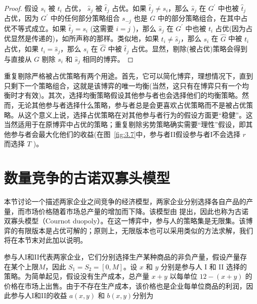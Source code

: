 \begin{proof}
    假设 \({s}_{i}\) 被 \({t}_{i}\) 占优， \({\widehat{s}}_{j}\) 被 \({\widehat{t}}_{j}\) 占优。如果 \({\widehat{t}}_{j} \neq  {s}_{i}\)，那么 \({\widehat{s}}_{j}\) 在 \({G}^{\prime }\) 中也被 \({\widehat{t}}_{j}\) 占优，因为 \({G}^{\prime }\) 中的任何部分策略组合 \({s}_{-j}\) 也是 \(G\) 中的部分策略组合，在其中占优不等式成立。如果 \({\widehat{t}}_{j} = {s}_{i}\) (这需要 \(i = j\) )，那么 \({\widehat{s}}_{j}\) 在 \({G}^{\prime }\) 中也被 \({t}_{i}\) 占优(因为占优显然是传递的)，如所声称的那样。类似地，如果 \({t}_{i} \neq  {\widehat{s}}_{j}\)，那么 \({s}_{i}\) 在 \(\widehat{G}\) 中被 \({t}_{i}\) 占优，如果 \({t}_{i} = {\widehat{s}}_{j}\)，那么 \({s}_{i}\) 在 \(\widehat{G}\) 中被 \({\widehat{t}}_{j}\) 占优。显然，剔除(被占优)策略会得到与直接从 \(G\) 剔除 \({s}_{i}\) 和 \({\widehat{s}}_{j}\) 相同的博弈。
\end{proof}

重复剔除严格被占优策略有两个用途。首先，它可以简化博弈，理想情况下，直到只剩下一个策略组合，这就是该博弈的唯一均衡(当然，这只有在博弈只有一个均衡时才有效)。其次，选择均衡策略假设其他参与者也会选择他们的均衡策略。然而，无论其他参与者选择什么策略，参与者总是会更喜欢占优策略而不是被占优策略。从这个意义上说，选择占优策略在对其他参与者行为的假设方面更“稳健”。这当然适用于在原博弈中占优的策略；重复剔除劣势策略确实需要“理性”假设，即其他参与者会最大化他们的收益(在图~\ref{fig:3.7}中，参与者II假设参与者I不会选择 \(r\) 而选择 \(T\) )。

\section{数量竞争的古诺双寡头模型}\label{sec-3.6}

本节讨论一个描述两家企业之间竞争的经济模型，两家企业分别选择各自产品的产量，而市场价格随着市场总产量的增加而下降。该模型由 \citet{cournot1838} 提出，因此也称为古诺双寡头模型（Cournot duopoly）。在这一博弈中，参与人的策略集是无限集。该博弈的有限版本是占优可解的；原则上，无限版本也可以采用类似的方法求解，我们将在本节末对此加以说明。

参与人I和II代表两家企业，它们分别选择生产某种商品的非负产量，假设产量存在某个上限\(M\)，因此 \({S}_{1} = {S}_{2} = \left\lbrack  {0,M}\right\rbrack\)。设 \(x\) 和 \(y\) 分别是参与人 I 和 II 选择的策略。为简单起见，假设没有生产成本，总产量 \(x + y\) 以每单位 \({12} - \left( {x + y}\right)\) 的价格在市场上出售。由于不存在生产成本，该价格也是企业每单位商品的利润，因此参与人I和II的收益 \(a\left( {x,y}\right)\) 和 \(b\left( {x,y}\right)\)分别为

